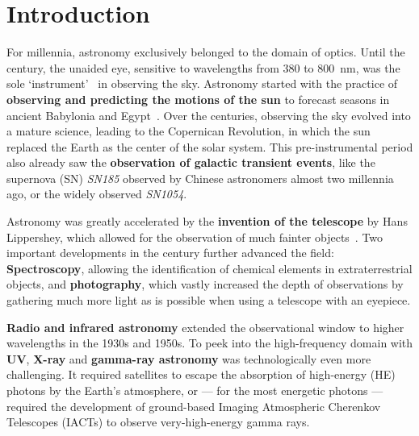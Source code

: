 \chapter*{Introduction}\label{introduction}

For millennia, astronomy exclusively belonged to the domain of optics. Until the  century, the unaided eye, sensitive to wavelengths from \num{380} to \SI{800}{\nano\m}, was the sole `instrument'~ in observing the sky. Astronomy started with the practice of \textbf{observing and predicting the motions of the sun} to forecast seasons in ancient Babylonia and Egypt~. Over the centuries, observing the sky evolved into a mature science, leading to the Copernican Revolution, in which the sun replaced the Earth as the center of the solar system. This pre-instrumental period also already saw the \textbf{observation of galactic transient events}, like the supernova (SN) \emph{SN185} observed by Chinese astronomers almost two millennia ago, or the widely observed \emph{SN1054}.

Astronomy was greatly accelerated by the \textbf{invention of the telescope} by Hans Lippershey, which allowed for the observation of much fainter objects~. Two important developments in the  century further advanced the field: \textbf{Spectroscopy}, allowing the identification of chemical elements in extraterrestrial objects, and \textbf{photography}, which vastly increased the depth of observations by gathering much more light as is possible when using a telescope with an eyepiece.

\textbf{Radio and infrared astronomy} extended the observational window to higher wavelengths in the 1930s and 1950s. To peek into the high-frequency domain with \textbf{UV}, \textbf{X-ray} and \textbf{gamma-ray astronomy} was technologically even more challenging. It required satellites to escape the absorption of high-energy (HE) photons by the Earth's atmosphere, or --- for the most energetic photons --- required the development of ground-based Imaging Atmospheric Cherenkov Telescopes (IACTs) to observe very-high-energy gamma rays.

